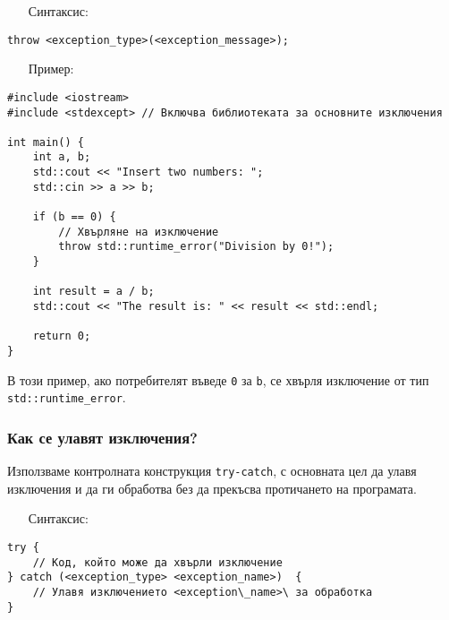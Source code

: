 \documentclass[oneside]{book}
\newcommand*{\code}[1]{\texttt{#1}}
\begin{document}
\begin{itemize}\item[Синтаксис:]\end{itemize}
\begin{mdframed}\begin{lstlisting}
throw <exception_type>(<exception_message>);
\end{lstlisting}\end{mdframed}
\pagebreak
\begin{itemize}\item[Пример:]\end{itemize}
\begin{mdframed}\begin{lstlisting}
#include <iostream>
#include <stdexcept> // Включва библиотеката за основните изключения

int main() {
    int a, b;
    std::cout << "Insert two numbers: ";
    std::cin >> a >> b;

    if (b == 0) {
        // Хвърляне на изключение
        throw std::runtime_error("Division by 0!");
    }

    int result = a / b;
    std::cout << "The result is: " << result << std::endl;

    return 0;
}
\end{lstlisting}\end{mdframed}

В този пример, ако потребителят въведе \code{0} за \code{b}, се хвърля изключение от тип \code{std::runtime\_error}.

\subsubsection{Как се улавят изключения?}
Използваме контролната конструкция \code{try-catch}, с основната цел да улавя изключения и да ги обработва без да прекъсва протичането на програмата.

\begin{itemize}\item[Синтаксис:]\end{itemize}
\begin{mdframed}\begin{lstlisting}
try {         
    // Код, който може да хвърли изключение
} catch (<exception_type> <exception_name>)  {   
    // Улавя изключението <exception\_name>\ за обработка
}
\end{lstlisting}\end{mdframed}
\end{document}
